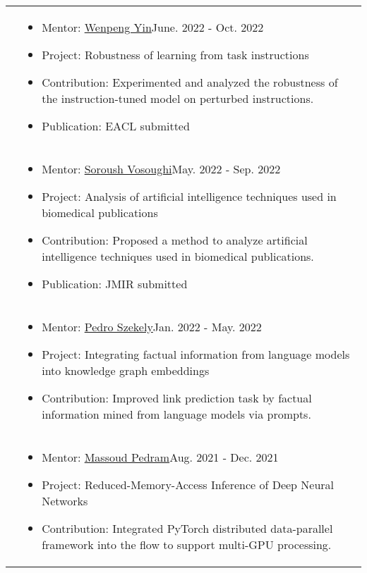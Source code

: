 \documentclass[letterpaper, 10pt]{article}
\begin{document}
\begin{longtable}{p{1.3in}p{4.8in}}
&  \begin{itemize}[leftmargin=10pt, itemsep=-5pt, topsep=0pt,before=\textbf{Pennsylvania State University}]
    \item Mentor: \href{https://www.wenpengyin.org/}{Wenpeng Yin}\hfill June. 2022 - Oct. 2022
    \item Project: Robustness of learning from task instructions\hfill
    \item Contribution: Experimented and analyzed the robustness of the instruction-tuned model on perturbed instructions.
    \item Publication: EACL submitted
  \end{itemize}\\ 

&  \begin{itemize}[leftmargin=10pt, itemsep=-5pt, topsep=0pt,before=\textbf{Dartmouth College}]
    \item Mentor: \href{https://www.cs.dartmouth.edu/~soroush//}{Soroush Vosoughi}\hfill May. 2022 - Sep. 2022
    \item Project: Analysis of artificial intelligence techniques used in biomedical publications\hfill
    \item Contribution: Proposed a method to analyze artificial intelligence techniques used in biomedical publications.
    \item Publication: JMIR submitted
  \end{itemize}\\ 
  
&  \begin{itemize}[leftmargin=10pt, itemsep=-5pt, topsep=0pt,before=\textbf{University of Southern California}]
    \item Mentor: \href{https://usc-isi-i2.github.io/szekely/}{Pedro Szekely}\hfill Jan. 2022 - May. 2022
    \item Project: Integrating factual information from language models into knowledge graph embeddings \hfill 
    \item Contribution: Improved link prediction task by factual information mined from language models via prompts.
  \end{itemize}\\ 

&  \begin{itemize}[leftmargin=10pt, itemsep=-5pt, topsep=0pt,before=\textbf{University of Southern California}]
    \item Mentor: \href{https://mpedram.com/}{Massoud Pedram}\hfill Aug. 2021 - Dec. 2021
    \item Project: Reduced-Memory-Access Inference of Deep Neural Networks\hfill
    \item Contribution: Integrated PyTorch distributed data-parallel framework into the flow to support multi-GPU processing.
  \end{itemize}\\ 


\end{longtable}
\end{document}
